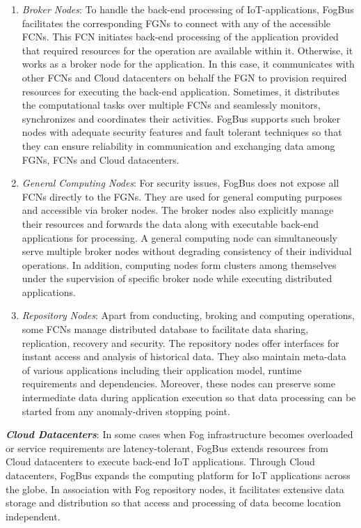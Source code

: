 \documentclass[final,5p,times,twocolumn]{elsarticle}
\begin{document}
\begin{enumerate}
\item \textit{Broker Nodes}: To handle the back-end processing of IoT-applications, FogBus facilitates the corresponding FGNs to connect with any of the accessible FCNs. This FCN initiates back-end processing of the application provided that required resources for the operation are available within it. Otherwise, it works as a broker node for the application. In this case, it communicates with other FCNs and Cloud datacenters on behalf the FGN to provision required resources for executing the back-end application. Sometimes, it distributes the computational tasks over multiple FCNs and seamlessly monitors, synchronizes and coordinates their activities. FogBus supports such broker nodes with adequate security features and fault tolerant techniques so that they can ensure reliability in communication and exchanging data among FGNs, FCNs and Cloud datacenters.        
%
\item \textit{General Computing Nodes}: For security issues, FogBus does not expose all FCNs directly to the FGNs. They are used for general computing purposes and accessible via broker nodes. The broker nodes also explicitly manage their resources and forwards the data along with executable back-end applications for processing. A general computing node can simultaneously serve multiple broker nodes without degrading consistency of their individual operations. In addition, computing nodes form clusters among themselves under the supervision of specific broker node while executing distributed applications.           
%
\item \textit{Repository Nodes}: Apart from conducting, broking and computing operations, some FCNs manage distributed database to facilitate data sharing, replication, recovery and security. The repository nodes offer interfaces for instant access and analysis of historical data. They also maintain meta-data of various applications including their application model, runtime requirements and dependencies. Moreover, these nodes can preserve some intermediate data during application execution so that data processing can be started from any anomaly-driven stopping point.
%
\end{enumerate}
\par \textbf{\textit{Cloud Datacenters}}: In some cases when Fog infrastructure becomes overloaded or service requirements are latency-tolerant, FogBus extends resources from Cloud datacenters to execute back-end IoT applications. Through Cloud datacenters, FogBus expands the computing platform for IoT applications across the globe. In association with Fog repository nodes, it facilitates extensive data storage and distribution so that access and processing of data become location independent.              
%
\end{document}
